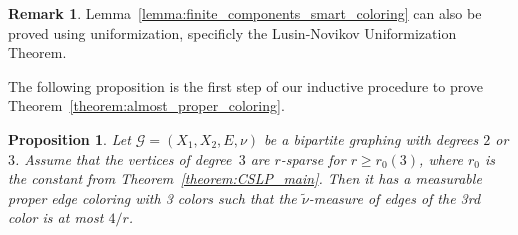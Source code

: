 \documentclass[11pt]{article}
\newtheorem{prop}[theo]{Proposition}
\theoremstyle{definition}
\newtheorem*{rema*}{Remark}
\numberwithin{equation}{section}
\numberwithin{figure}{section}
\numberwithin{table}{section}
\newcommand{\G}{\mathcal{G}}
\begin{document}
\begin{rema*}
Lemma~\ref{lemma:finite_components_smart_coloring} can also be proved using uniformization, specificly the Lusin-Novikov Uniformization Theorem.
\end{rema*}


The following proposition is the first step of our inductive procedure to prove Theorem~\ref{theorem:almost_proper_coloring}.

\begin{prop}\label{proposition:induction_start}
Let $\G=(X_1,X_2,E, \nu)$ be a bipartite graphing with degrees $2$ or $3$. Assume that the vertices of degree~$3$ are $r$-sparse for $r \geq r_0(3)$, where $r_0$ is the constant from Theorem~\ref{theorem:CSLP_main}. Then it has a measurable proper edge coloring with 3 colors such that the $\widetilde{\nu}$-measure of edges of the 3rd color is at most $4/r$.
\end{prop}
\end{document}
